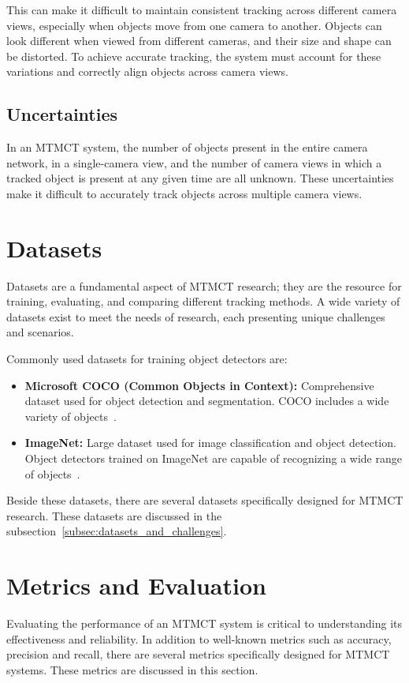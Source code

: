 This can make it difficult to maintain consistent tracking across different camera views, especially when objects move from one camera to another. Objects can look different when viewed from different cameras, and their size and shape can be distorted. To achieve accurate tracking, the system must account for these variations and correctly align objects across camera views.

\subsection{Uncertainties}\label{subsec:uncertainties}
In an MTMCT system, the number of objects present in the entire camera network, in a single-camera view, and the number of camera views in which a tracked object is present at any given time are all unknown. These uncertainties make it difficult to accurately track objects across multiple camera views.

\section{Datasets}\label{sec:datasets}
Datasets are a fundamental aspect of MTMCT research; they are the resource for training, evaluating, and comparing different tracking methods. A wide variety of datasets exist to meet the needs of research, each presenting unique challenges and scenarios.

Commonly used datasets for training object detectors are:

\begin{itemize}
    \item \textbf{Microsoft COCO (Common Objects in Context):} Comprehensive dataset used for object detection and segmentation. COCO includes a wide variety of objects~\cite{Lin14}.
    \item \textbf{ImageNet:} Large dataset used for image classification and object detection. Object detectors trained on ImageNet are capable of recognizing a wide range of objects~\cite{Deng09}.
\end{itemize}

Beside these datasets, there are several datasets specifically designed for MTMCT research. These datasets are discussed in the subsection~\ref{subsec:datasets_and_challenges}.

\section{Metrics and Evaluation}\label{sec:metrics_and_evaluation}
Evaluating the performance of an MTMCT system is critical to understanding its effectiveness and reliability. In addition to well-known metrics such as accuracy, precision and recall, there are several metrics specifically designed for MTMCT systems. These metrics are discussed in this section.

